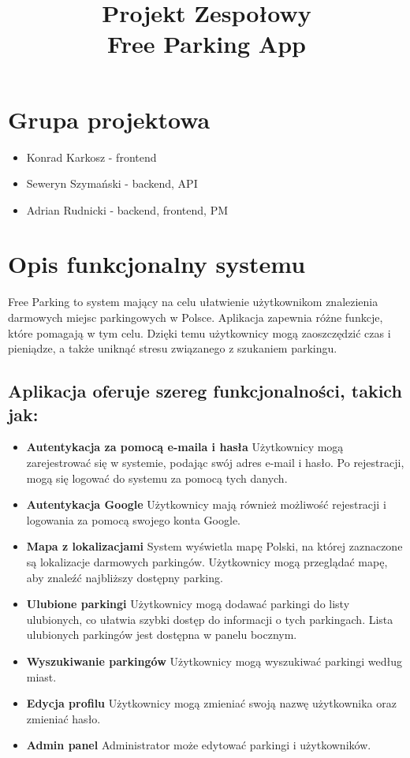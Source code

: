 \documentclass{article}
\title{
	Projekt Zespołowy\\
	\Huge{Free Parking App}
}
\date{}
\begin{document}
	\maketitle

    \section{Grupa projektowa}
        \begin{itemize}
            \item Konrad Karkosz - frontend
            \item Seweryn Szymański - backend, API
            \item Adrian Rudnicki - backend, frontend, PM
        \end{itemize}
	\section {Opis funkcjonalny systemu}
    Free Parking to system mający na celu ułatwienie użytkownikom znalezienia darmowych miejsc parkingowych w Polsce. Aplikacja zapewnia różne funkcje, które pomagają w tym celu. Dzięki temu użytkownicy mogą zaoszczędzić czas i pieniądze, a także uniknąć stresu związanego z szukaniem parkingu.
    
    \subsection{Aplikacja oferuje szereg funkcjonalności, takich jak:}
    \begin{itemize}
        \item \textbf{Autentykacja za pomocą e-maila i hasła} Użytkownicy mogą zarejestrować się w systemie, podając swój adres e-mail i hasło. Po rejestracji, mogą się logować do systemu za pomocą tych danych.
        \item \textbf{Autentykacja Google} Użytkownicy mają również możliwość rejestracji i logowania za pomocą swojego konta Google.
        \item \textbf{Mapa z lokalizacjami} System wyświetla mapę Polski, na której zaznaczone są lokalizacje darmowych parkingów. Użytkownicy mogą przeglądać mapę, aby znaleźć najbliższy dostępny parking.
        \item \textbf{Ulubione parkingi} Użytkownicy mogą dodawać parkingi do listy ulubionych, co ułatwia szybki dostęp do informacji o tych parkingach. Lista ulubionych parkingów jest dostępna w panelu bocznym.
        \item \textbf{Wyszukiwanie parkingów} Użytkownicy mogą wyszukiwać parkingi według miast.
        \item \textbf{Edycja profilu} Użytkownicy mogą zmieniać swoją nazwę użytkownika oraz zmieniać hasło.
        \item \textbf{Admin panel} Administrator może edytować parkingi i użytkowników.
    \end{itemize}
\end{document}
